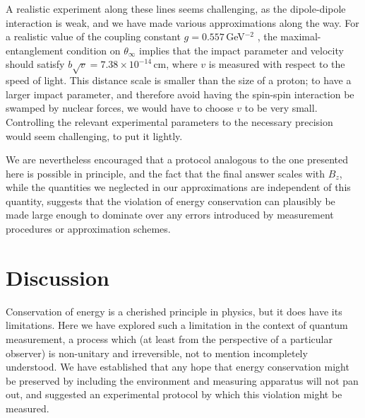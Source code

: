 \documentclass[aps,prd,onecolumn,nofootinbib,notitlepage]{revtex4-1}
\begin{document}
A realistic experiment along these lines seems challenging, as the dipole-dipole interaction is weak, and we have made various approximations along the way.
For a realistic value of the coupling constant $g= 0.557\,$GeV$^{-2}$ \cite{levitt2015, gamman, gammap}, the maximal-entanglement condition on $\theta_\infty$ implies that the impact parameter and velocity should satisfy $b\sqrt{v} = 7.38\times 10^{-14}\,$cm, where $v$ is measured with respect to the speed of light. 
This distance scale is smaller than the size of a proton; to have a larger impact parameter, and therefore avoid having the spin-spin interaction be swamped by nuclear forces, we would have to choose $v$ to be very small.
Controlling the relevant experimental parameters to the necessary precision would seem challenging, to put it lightly.

We are nevertheless encouraged that a protocol analogous to the one presented here is possible in principle, and the fact that the final answer scales with $B_z$, while the quantities we neglected in our approximations are independent of this quantity, suggests that the violation of energy conservation can plausibly be made large enough to dominate over any errors introduced by measurement procedures or approximation schemes.


\section{Discussion}

Conservation of energy is a cherished principle in physics, but it does have its limitations.
Here we have explored such a limitation in the context of quantum measurement, a process which (at least from the perspective of a particular observer) is non-unitary and irreversible, not to mention incompletely understood.
We have established that any hope that energy conservation might be preserved by including the environment and measuring apparatus will not pan out, and suggested an experimental protocol by which this violation might be measured.
\end{document}
